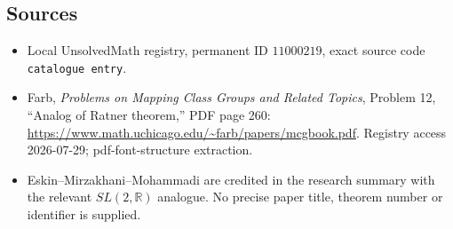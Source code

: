 \documentclass[11pt]{article}
\newcommand{\R}{\mathbb{R}}
\begin{document}
\subsection{Sources}
\begin{itemize}
\item Local UnsolvedMath registry, permanent ID \(11000219\), exact source code \texttt{catalogue entry}.
\item Farb, \emph{Problems on Mapping Class Groups and Related Topics}, Problem 12, ``Analog of Ratner theorem,'' PDF page 260: \url{https://www.math.uchicago.edu/~farb/papers/mcgbook.pdf}. Registry access 2026-07-29; pdf-font-structure extraction.
\item Eskin--Mirzakhani--Mohammadi are credited in the research summary with the relevant \(SL(2,\R)\) analogue. No precise paper title, theorem number or identifier is supplied.
\end{itemize}
\end{document}
